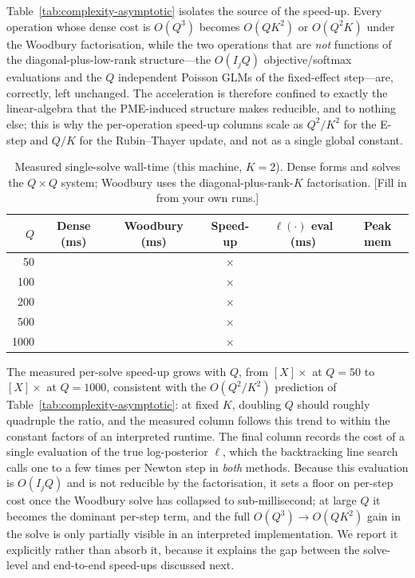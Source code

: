 Table~\ref{tab:complexity-asymptotic} isolates the source of the speed-up. Every operation
whose dense cost is $O(Q^3)$ becomes $O(QK^2)$ or $O(Q^2K)$ under the Woodbury
factorisation, while the two operations that are \emph{not} functions of the
diagonal-plus-low-rank structure---the $O(I_jQ)$ objective/softmax evaluations and the $Q$
independent Poisson GLMs of the fixed-effect step---are, correctly, left unchanged. The
acceleration is therefore confined to exactly the linear-algebra that the PME-induced
structure makes reducible, and to nothing else; this is why the
per-operation speed-up columns scale as $Q^2/K^2$ for the E-step and $Q/K$ for the
Rubin--Thayer update, and not as a single global constant.
\fi
\iffalse
\begin{table}[H]
\centering
\caption{Measured single-solve wall-time (this machine, $K=2$). Dense forms and
solves the $Q\times Q$ system; Woodbury uses the diagonal-plus-rank-$K$ factorisation.
[Fill in from your own runs.]}
\label{tab:solve-timing}
\begin{tabular}{@{}rccccc@{}}
\toprule
$Q$ & Dense (ms) & Woodbury (ms) & Speed-up & $\ell(\cdot)$ eval (ms) & Peak mem \\
\midrule
50   & \phantom{000.00} & \phantom{00.00} & \phantom{000}$\times$ & \phantom{0.00} & \\
100  &  &  & $\times$ &  & \\
200  &  &  & $\times$ &  & \\
500  &  &  & $\times$ &  & \\
1000 &  &  & $\times$ &  & \\
\bottomrule
\end{tabular}
\end{table}

The measured per-solve speed-up grows with $Q$, from $[X]\times$ at $Q=50$ to $[X]\times$ at
$Q=1000$, consistent with the $O(Q^2/K^2)$ prediction of
Table~\ref{tab:complexity-asymptotic}: at fixed $K$, doubling $Q$ should roughly quadruple the
ratio, and the measured column follows this trend to within the constant factors of an
interpreted runtime. The final column records the cost of a single evaluation of the
true log-posterior $\ell$, which the backtracking line search calls one to a few times per
Newton step in \emph{both} methods. Because this evaluation is $O(I_jQ)$ and is not reducible
by the factorisation, it sets a floor on per-step cost once the Woodbury solve has collapsed
to sub-millisecond; at large $Q$ it becomes the dominant per-step term, and the full
$O(Q^3)\!\to\!O(QK^2)$ gain in the solve is only partially visible in an interpreted
implementation. We report it explicitly rather than absorb it, because it explains the gap
between the solve-level and end-to-end speed-ups discussed next.

